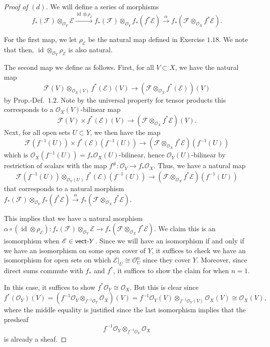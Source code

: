 \documentclass[10pt]{article}
\theoremstyle{definition}
\theoremstyle{remark}
\numberwithin{equation}{section}
\numberwithin{figure}{subsubsection}
\DeclareMathOperator{\id}{id}
\newcommand{\EE}{\mathscr{E}}
\newcommand{\FF}{\mathscr{F}}
\newcommand{\OO}{\mathcal{O}}
\newcommand{\vect}{\mathsf{vect}\mathchar`-}
\begin{document}
\begin{proof}[Proof of $(d)$]
  We will define a series of morphisms
  \begin{equation*}
    f_*(\FF) \otimes_{\OO_Y} \EE \overset{\id\otimes\rho_\EE}{\longrightarrow} f_*(\FF) \otimes_{\OO_Y} f_*(f^*\EE) \overset{\alpha}{\longrightarrow} f_*(\FF \otimes_{\OO_X} f^*\EE).
  \end{equation*}
  \par For the first map, we let $\rho_\EE$ be the natural map defined in
  Exercise $1.18$. We note that then, $\id \otimes_{\OO_Y} \rho_\EE$ is also natural.
  \par The second map we define as follows. First, for all $V \subset X$, we have the natural map
  \begin{equation*}
    \FF(V) \otimes_{\OO_X(V)} f^*(\EE)(V) \to (\FF \otimes_{\OO_X} f^*(\EE))(V)
  \end{equation*}
  by Prop.-Def.~$1.2$. Note by the universal property for tensor products this corresponds to a $\OO_X(V)$-bilinear map
  \begin{equation*}
    \FF(V) \times f^*(\EE)(V) \to (\FF \otimes_{\OO_X} f^*\EE)(V).
  \end{equation*}
  Next, for all open sets $U \subset Y$, we then have the map
  \begin{equation*}
    \FF(f^{-1}(U)) \times f^*(\EE)(f^{-1}(U)) \to (\FF \otimes_{\OO_X} f^*\EE)(f^{-1}(U))
  \end{equation*}
  which is $\OO_X(f^{-1}(U)) = f_*\OO_X(U)$-bilinear, hence $\OO_Y(U)$-bilinear by restriction of scalars with the map $f^\#\colon\OO_Y \to f_*\OO_X$. Thus, we have a natural map
  \begin{equation*}
    \FF(f^{-1}(U)) \otimes_{\OO_Y(U)} f^*(\EE)(f^{-1}(U)) \to (\FF \otimes_{\OO_X} f^*\EE)(f^{-1}(U))
  \end{equation*}
  that corresponds to a natural morphism $f_*(\FF) \otimes_{\OO_Y} f_*(f^*\EE) \overset{\alpha}{\longrightarrow} f_*(\FF \otimes_{\OO_X} f^*\EE)$.
  \par This implies that we have a natural morphism $\alpha \circ (\id \otimes \rho_\EE)\colon f_*(\FF) \otimes_{\OO_Y} \EE \to f_*(\FF \otimes_{\OO_X} f^*\EE)$. We claim this is an isomorphism when $\EE \in \vect Y$. Since we will have an isomorphism if and only if we have an isomorphism on some open cover of $Y$, it suffices to check we have an isomorphism for open sets on which $\EE\vert_U \cong \OO_U^n$ since they cover $Y$. Moreover, since direct sums commute with $f_*$ and $f^*$, it suffices to show the claim for when $n = 1$.
  \par In this case, it suffices to show $f^*\OO_Y \cong \OO_X$. But this is clear since
  \begin{equation*}
    f^*(\OO_Y)(V) = (f^{-1}\OO_Y \otimes_{f^{-1}\OO_Y} \OO_X)(V) = f^{-1}\OO_Y(V) \otimes_{f^{-1}\OO_Y(V)} \OO_X(V) \cong \OO_X(V),
  \end{equation*}
  where the middle equality is justified since the last isomorphism implies that
  the presheaf \[f^{-1}\OO_Y \otimes_{f^{-1}\OO_Y} \OO_X\] is already a sheaf.
\end{proof}
\end{document}
